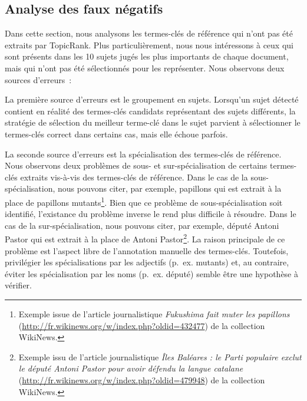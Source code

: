   \subsection{Analyse des faux négatifs}
  \label{subsec:analyse_faux_négatifs}
    Dans cette section, nous analysons les termes-clés de référence qui n'ont
    pas été extraits par TopicRank. Plus particulièrement, nous nous intéressons
    à ceux qui sont présents dans les 10 sujets jugés les plus importants de
    chaque document, mais qui n'ont pas été sélectionnés pour les représenter.
    Nous observons deux sources d'erreurs~:

    La première source d'erreurs est le groupement en sujets. Lorsqu'un sujet
    détecté contient en réalité des termes-clés candidats représentant des
    sujets différents, la stratégie de sélection du meilleur terme-clé dans le
    sujet parvient à sélectionner le termes-clés correct dans certains cas, mais
    elle échoue parfois.

    La seconde source d'erreurs est la spécialisation des termes-clés de
    référence. Nous observons deux problèmes de sous- et
    sur-spécialisation de certains termes-clés extraits vis-à-vis des termes-clés
    de référence. Dans le cas de la sous-spécialisation, nous pouvons citer, par
    exemple, \og{}papillons\fg{} qui est extrait à la place de \og{}papillons
    mutants\fg{}\footnote{Exemple issue de l'article journalistique
    \textit{Fukushima fait muter les papillons}
    (\url{http://fr.wikinews.org/w/index.php?oldid=432477}) de la collection
    WikiNews.}. Bien que ce problème de sous-spécialisation soit identifié,
    l'existance du problème inverse le rend plus difficile à résoudre. Dans le
    cas de la sur-spécialisation, nous pouvons citer, par exemple, \og{}député
    Antoni Pastor\fg{} qui est extrait à la place de \og{}Antoni
    Pastor\fg{}\footnote{Exemple issu de l'article journalistique \textit{Îles
    Baléares : le Parti populaire exclut le député Antoni Pastor pour avoir
    défendu la langue catalane}
    (\url{http://fr.wikinews.org/w/index.php?oldid=479948}) de la collection
    WikiNews.}. La raison principale de ce problème est l'aspect libre de
    l'annotation manuelle des termes-clés. Toutefois, privilégier les
    spécialisations par les adjectifs (p.~ex. \og{}mutants\fg{}) et, au
    contraire, éviter les spécialisation par les noms (p.~ex. \og{}député\fg{})
    semble être une hypothèse à vérifier.

